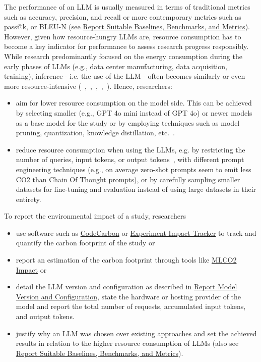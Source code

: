 The performance of an LLM is usually measured in terms of traditional metrics such as accuracy, precision, and recall or more contemporary metrics such as pass@k, or BLEU-N (see \href{/guidelines/report-baselines-benchmarks-and-metrics}{Report Suitable Baselines, Benchmarks, and Metrics}). However, given how resource-hungry LLMs are, resource consumption has to become a key indicator for performance to assess research progress responsibly. 
While research predominantly focused on the energy consumption during the early phases of LLMs (e.g., data center manufacturing, data acquisition, training), inference - i.e. the use of the LLM - often becomes similarly or even more resource-intensive (~\cite{de2023growing},~\cite{DBLP:conf/mlsys/WuRGAAMCBHBGGOM22},~\cite{DBLP:journals/corr/abs-2410-02950},~\cite{JIANG2024202},~\cite{mitu2024hidden}).
Hence, researchers:
\begin{itemize}
  \item \should aim for lower resource consumption on the model side. This can be achieved by selecting smaller (e.g., GPT 4o mini instead of GPT 4o) or newer models as a base model for the study or by employing techniques such as model pruning, quantization, knowledge distillation, etc.~\cite{mitu2024hidden}.
  \item \should reduce resource consumption when using the LLMs, e.g. by restricting the number of queries, input tokens, or output tokens~\cite{mitu2024hidden}, with different prompt engineering techniques (e.g., on average zero-shot prompts seem to emit less CO2 than Chain Of Thought prompts), or by carefully sampling smaller datasets for fine-tuning and evaluation instead of using large datasets in their entirety.
\end{itemize}
To report the environmental impact of a study, researchers
\begin{itemize}
    \item \should use software such as \href{https://github.com/mlco2/codecarbon}{CodeCarbon} or \href{experiment-impact-tracker}{Experiment Impact Tracker} to track and quantify the carbon footprint of the study or
    \item \should report an estimation of the carbon footprint through tools like \href{https://mlco2.github.io/impact/#about}{MLCO2 Impact} or
    \item \should detail the LLM version and configuration as described in \href{/guidelines/report-version-and-configuration}{Report Model Version and Configuration}, state the hardware or hosting provider of the model and report the total number of requests, accumulated input tokens, and output tokens.
    \item \must justify why an LLM was chosen over existing approaches and set the achieved results in relation to the higher resource consumption of LLMs (also see \href{/guidelines/report-baselines-benchmarks-and-metrics}{Report Suitable Baselines, Benchmarks, and Metrics}).%
\end{itemize}
